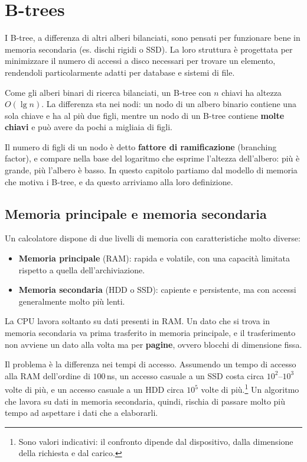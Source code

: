 \chapter{B-trees}\label{ch:btree}
I B-tree, a differenza di altri alberi bilanciati, sono pensati per funzionare bene in memoria secondaria (es. dischi rigidi o SSD). La loro struttura è progettata per minimizzare il numero di accessi a disco necessari per trovare un elemento, rendendoli particolarmente adatti per database e sistemi di file.

Come gli alberi binari di ricerca bilanciati, un B-tree con $n$ chiavi ha altezza $O(\lg n)$. La differenza sta nei nodi: un nodo di un albero binario contiene una sola chiave e ha al più due figli, mentre un nodo di un B-tree contiene \textbf{molte chiavi} e può avere da pochi a migliaia di figli.

Il numero di figli di un nodo è detto \textbf{fattore di ramificazione} (branching factor), e compare nella base del logaritmo che esprime l'altezza dell'albero: più è grande, più l'albero è basso. In questo capitolo partiamo dal modello di memoria che motiva i B-tree, e da questo arriviamo alla loro definizione.

\section{Memoria principale e memoria secondaria}\label{sec:btree-memoria}
Un calcolatore dispone di due livelli di memoria con caratteristiche molto diverse:
\begin{itemize}
    \item \textbf{Memoria principale} (RAM): rapida e volatile, con una capacità limitata rispetto a quella dell'archiviazione.
    \item \textbf{Memoria secondaria} (HDD o SSD): capiente e persistente, ma con accessi generalmente molto più lenti.
\end{itemize}
La CPU lavora soltanto su dati presenti in RAM. Un dato che si trova in memoria secondaria va prima trasferito in memoria principale, e il trasferimento non avviene un dato alla volta ma per \textbf{pagine}, ovvero blocchi di dimensione fissa.

Il problema è la differenza nei tempi di accesso. Assumendo un tempo di accesso alla RAM dell'ordine di $100$\,ns, un accesso casuale a un SSD costa circa $10^2$--$10^3$ volte di più, e un accesso casuale a un HDD circa $10^5$ volte di più.\footnote{Sono valori indicativi: il confronto dipende dal dispositivo, dalla dimensione della richiesta e dal carico.} Un algoritmo che lavora su dati in memoria secondaria, quindi, rischia di passare molto più tempo ad aspettare i dati che a elaborarli.


